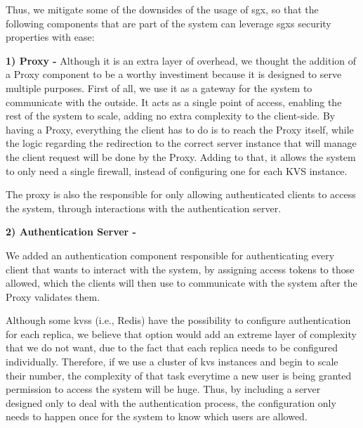 Thus, we mitigate some of the downsides of the usage of \gls{sgx}, so that the following components that are part of the system can leverage \gls{sgx}s security properties with ease:

\vspace{5mm} 

\textbf{1) Proxy -}
Although it is an extra layer of overhead, we thought the addition of a Proxy component to be a worthy investiment because it is designed to serve multiple purposes. 
First of all, we use it as a gateway for the system to communicate with the outside. It acts as a single point of access, enabling the rest of the system to scale, adding no extra complexity to the client-side. By having a Proxy, everything the client has to do is to reach the Proxy itself, while the logic regarding the redirection to the correct server instance that will manage the client request will be done by the Proxy. Adding to that, it allows the system to only need a single firewall, instead of configuring one for each KVS instance.

The proxy is also the responsible for only allowing authenticated clients to access the system, through interactions with the authentication server. 

\vspace{5mm} 

\textbf{2) Authentication Server -} 



We added an authentication component responsible for authenticating every client that wants to interact with the system, by assigning access tokens to those allowed, which the clients will then use to communicate with the system after the Proxy validates them.
 
Although some \gls{kvs}s (i.e., Redis) have the possibility to configure authentication for each replica, we believe that option would add an extreme layer of complexity that we do not want, due to the fact that each replica needs to be configured individually. Therefore, if we use a cluster of \gls{kvs} instances and begin to scale their number, the complexity of that task everytime a new user is being granted permission to access the system will be huge. Thus, by including a server designed only to deal with the authentication process, the configuration only needs to happen once for the system to know which users are allowed.



\vspace{3mm}

